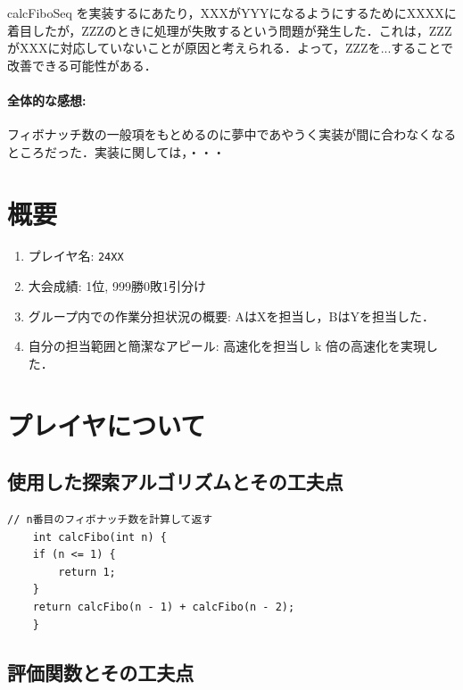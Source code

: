 \documentclass[10pt,a4j]{ujarticle} %
\begin{document}
calcFiboSeq を実装するにあたり，XXXがYYYになるようにするためにXXXXに着目したが，ZZZのときに処理が失敗するという問題が発生した．これは，ZZZがXXXに対応していないことが原因と考えられる．よって，ZZZを...することで改善できる可能性がある．

\paragraph{全体的な感想: } フィボナッチ数の一般項をもとめるのに夢中であやうく実装が間に合わなくなるところだった．実装に関しては，・・・

\section{概要}
\begin{screen}
\begin{enumerate}
\setlength{\itemsep}{2pt}      %
\setlength{\parskip}{0pt}      %
\item プレイヤ名: {\verb+24XX+}
\item 大会成績: 1位, 999勝0敗1引分け
\item グループ内での作業分担状況の概要: AはXを担当し，BはYを担当した．
\item 自分の担当範囲と簡潔なアピール: 高速化を担当し k 倍の高速化を実現した．
\end{enumerate}
\end{screen}

\section{プレイヤについて}

\subsection{使用した探索アルゴリズムとその工夫点}

\begin{lstlisting}[caption=calcFiboメソッドの工夫点,label=src:calcFibo]
    // n番目のフィボナッチ数を計算して返す
    int calcFibo(int n) {
	if (n <= 1) {
	    return 1;
	}
	return calcFibo(n - 1) + calcFibo(n - 2);
    }
\end{lstlisting}

\subsection{評価関数とその工夫点}
\end{document}
